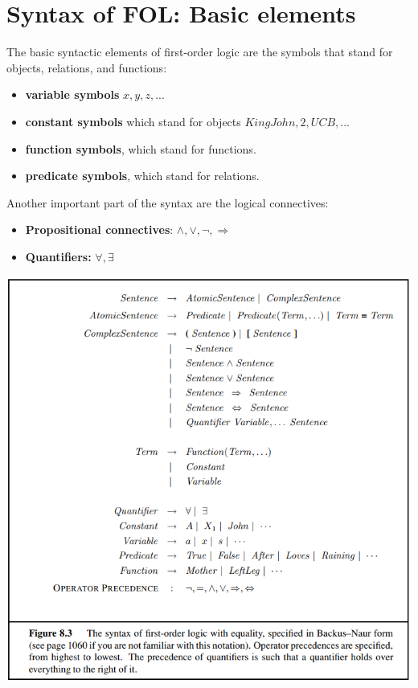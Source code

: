 \section{Syntax of FOL: Basic elements}
The basic syntactic elements of first-order logic are the symbols that stand for objects, relations, and functions:
\begin{itemize}
    \item \textbf{variable symbols} $x, y, z, ...$
    \item \textbf{constant  symbols} which stand for objects $KingJohn, 2, UCB,...$
    \item \textbf{function symbols}, which stand for functions.
    \item \textbf{predicate symbols}, which stand for relations.
\end{itemize}
Another important part of the syntax are the logical connectives:
\begin{itemize}
    \item \textbf{Propositional connectives}: $\land, \lor, \neg, \Rightarrow$
    \item \textbf{Quantifiers:} $\forall, \exists$
\end{itemize}
\begin{center}
    \includegraphics[]{images/FOL.png}
\end{center}

